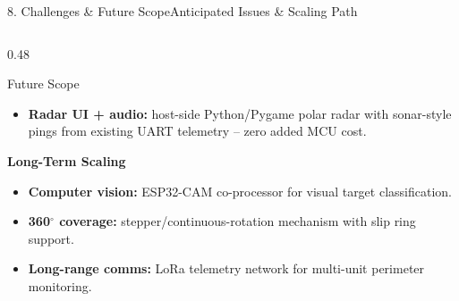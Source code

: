 \documentclass[aspectratio=169, 10pt]{beamer}
\begin{document}
\begin{frame}{8. Challenges \& Future Scope}{Anticipated Issues \& Scaling Path}
\begin{columns}[T]
\begin{column}{0.48\textwidth}
\begin{block}{Future Scope}
\begin{itemize}
                    \item \textbf{Radar UI + audio:} host-side Python/Pygame polar radar with sonar-style pings from existing UART telemetry -- zero added MCU cost.
                \end{itemize}
                \textbf{Long-Term Scaling}
                \begin{itemize}
                    \item \textbf{Computer vision:} ESP32-CAM co-processor for visual target classification.
                    \item \textbf{360$^\circ$ coverage:} stepper/continuous-rotation mechanism with slip ring support.
                    \item \textbf{Long-range comms:} LoRa telemetry network for multi-unit perimeter monitoring.
                \end{itemize}
            \end{block}
        \end{column}
    \end{columns}
\end{frame}
\end{document}
